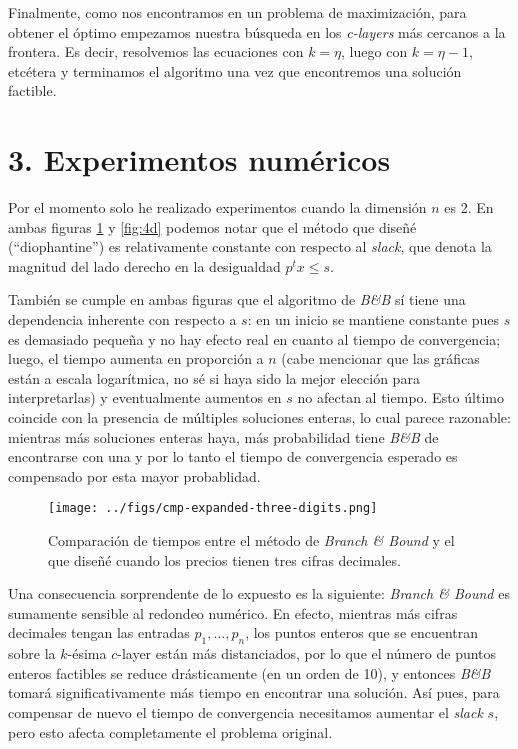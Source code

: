 \documentclass[11pt]{article}
\begin{document}
Finalmente, como nos encontramos en un problema de maximización, para obtener el óptimo empezamos
nuestra búsqueda en los \textit{c-layers} más cercanos a la frontera. Es decir, resolvemos las
ecuaciones con $k = \eta$, luego con $k = \eta - 1$, etcétera y terminamos el algoritmo una vez que
encontremos una solución factible.

\section*{3. Experimentos numéricos}
Por el momento solo he realizado experimentos cuando la dimensión $n$ es 2. En ambas figuras
\ref{fig:3d} y \ref{fig:4d} podemos notar que el método que diseñé (``diophantine'') es
relativamente constante con respecto al \textit{slack}, que denota la magnitud del lado derecho en
la desigualdad $p^tx \leq s$.

También se cumple en ambas figuras que el algoritmo de \textit{B\&B} sí tiene una dependencia
inherente con respecto a $s$: en un inicio se mantiene constante pues $s$ es demasiado pequeña y no
hay efecto real en cuanto al tiempo de convergencia; luego, el tiempo aumenta en proporción a $n$
(cabe mencionar que las gráficas están a escala logarítmica, no sé si haya sido la mejor elección
para interpretarlas) y eventualmente aumentos en $s$ no afectan al tiempo. Esto último coincide con
la presencia de múltiples soluciones enteras, lo cual parece razonable: mientras más soluciones
enteras haya, más probabilidad tiene \textit{B\&B} de encontrarse con una y por lo tanto el tiempo
de convergencia esperado es compensado por esta mayor probablidad.

\begin{figure}[h]
    \centering
    \texttt{[image: ../figs/cmp-expanded-three-digits.png]}
	\caption{Comparación de tiempos entre el método de \textit{Branch \& Bound} y el que diseñé
	cuando los precios tienen tres cifras decimales.}
    \label{fig:3d}
\end{figure}

Una consecuencia sorprendente de lo expuesto es la siguiente: \textit{Branch \& Bound} es sumamente
sensible al redondeo numérico. En efecto, mientras más cifras decimales tengan las entradas $p_1,
\ldots, p_n$, los puntos enteros que se encuentran sobre la $k$-ésima $c$-layer están más
distanciados, por lo que el número de puntos enteros factibles se reduce drásticamente (en un orden
de 10), y entonces \textit{B\&B} tomará significativamente más tiempo en encontrar una solución.
Así pues, para compensar de nuevo el tiempo de convergencia necesitamos aumentar el \textit{slack}
$s$, pero esto afecta completamente el problema original.
\end{document}
